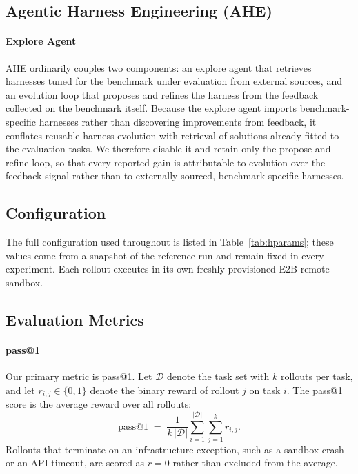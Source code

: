 \documentclass{article}
\begin{document}
\subsection{Agentic Harness Engineering (AHE)}

\paragraph{Explore Agent}
AHE ordinarily couples two components: an explore agent that retrieves harnesses tuned for the benchmark under evaluation from external sources, and an evolution loop that proposes and refines the harness from the feedback collected on the benchmark itself. Because the explore agent imports benchmark-specific harnesses rather than discovering improvements from feedback, it conflates reusable harness evolution with retrieval of solutions already fitted to the evaluation tasks. We therefore disable it and retain only the propose and refine loop, so that every reported gain is attributable to evolution over the feedback signal rather than to externally sourced, benchmark-specific harnesses.

\subsection{Configuration}
The full configuration used throughout is listed in
Table~\ref{tab:hparams}; these values come from a snapshot of the reference run and remain fixed in every experiment. Each rollout executes in its own freshly provisioned E2B remote sandbox.
 
\subsection{Evaluation Metrics}

\paragraph{pass@1}
Our primary metric is pass@1. Let $\mathcal{D}$ denote the task set with $k$ rollouts per task, and let $r_{i,j} \in \{0, 1\}$ denote the binary reward of rollout $j$ on task $i$. The pass@1 score is the average reward over all rollouts:
\begin{equation}
    \mathrm{pass@1}
    \;=\;
    \frac{1}{k\,\lvert \mathcal{D} \rvert}
    \sum_{i=1}^{\lvert \mathcal{D} \rvert}
    \sum_{j=1}^{k}
    r_{i,j}.
    \label{eq:pass1}
\end{equation}
Rollouts that terminate on an infrastructure exception, such as a sandbox crash or an API timeout, are scored as $r = 0$ rather than excluded from the average.
\end{document}
